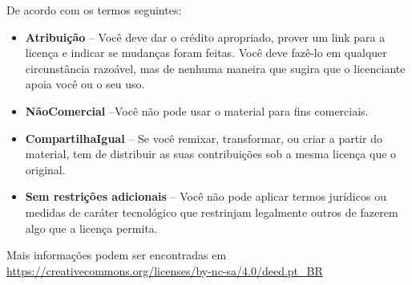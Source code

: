 \documentclass[12pt]{article}
\begin{document}
De acordo com os termos seguintes:
\begin{itemize}
\item \textbf{Atribuição} -- Você deve dar o crédito apropriado, prover um link para a licença e indicar se mudanças foram feitas. Você deve fazê-lo em qualquer circunstância razoável, mas de nenhuma maneira que sugira que o licenciante apoia você ou o seu uso.
\item \textbf{NãoComercial} --Você não pode usar o material para fins comerciais.
\item \textbf{CompartilhaIgual} -- Se você remixar, transformar, ou criar a partir do material, tem de distribuir as suas contribuições sob a mesma licença que o original.
\item \textbf{Sem restrições adicionais} -- Você não pode aplicar termos jurídicos ou medidas de caráter tecnológico que restrinjam legalmente outros de fazerem algo que a licença permita.
\end{itemize}

Mais informações podem ser encontradas em \url{https://creativecommons.org/licenses/by-nc-sa/4.0/deed.pt_BR}
\end{document}
